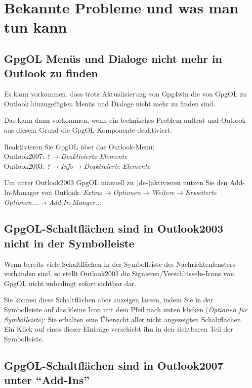 \documentclass[a4paper,11pt, oneside,openright,titlepage,dvips]{scrbook}
\newcommand{\Menu}[1]{\emph{#1}}
\newcounter{chapter}
\newcounter{section}[chapter]
\begin{document}
\clearpage
{}
\chapter{Bekannte Probleme und was man tun kann}

\section{GpgOL Menüs und Dialoge nicht mehr in Outlook zu finden}

Es kann vorkommen, dass trotz Aktualisierung von Gpg4win
die von GpgOL zu Outlook hinzugefügten Menüs und Dialoge nicht mehr zu finden sind.

Das kann dann vorkommen, wenn ein technisches Problem auftrat
und Outlook aus diesem Grund die GpgOL-Komponente deaktiviert.

Reaktivieren Sie GpgOL über das Outlook-Menü:\\
Outlook2007: \Menu{?$\rightarrow$Deaktivierte Elemente}\\
Outlook2003: \Menu{?$\rightarrow$Info$\rightarrow$Deaktivierte Elemente}

Um unter Outlook2003 GpgOL manuell zu (de-)aktivieren nutzen Sie den Add-In-Manager von
Outlook:
\Menu{Extras$\rightarrow$Optionen$\rightarrow$Weitere$\rightarrow$Erweiterte
Optionen...$\rightarrow$Add-In-Manger...}


\section{GpgOL-Schaltflächen sind in Outlook2003 nicht in der Symbolleiste}

Wenn bereits viele Schaltflächen in der Symbolleiste des Nachrichtenfensters
vorhanden sind, so stellt Outlook2003 die
Signieren/Verschlüsseln-Icons von GpgOL nicht unbedingt sofort sichtbar dar.

Sie können diese Schaltflächen aber anzeigen lassen,
indem Sie in der Symbolleiste auf das kleine Icon mit dem Pfeil nach
unten klicken (\textit{Optionen für Symbolleiste}):  Sie erhalten
eine Übersicht aller nicht angezeigten Schaltflächen. Ein Klick auf
eines dieser Einträge verschiebt ihn in den sichtbaren Teil der Symbolleiste.


\section{GpgOL-Schaltflächen sind in Outlook2007 unter "`Add-Ins"'}
\end{document}

